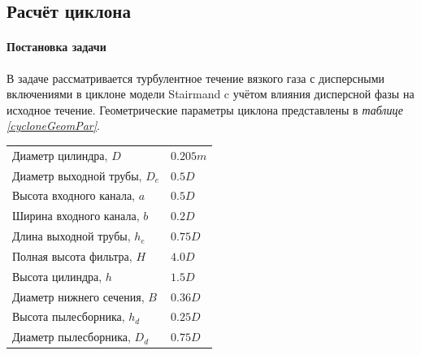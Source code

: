 \subsection{Расчёт циклона}
\label{cycRes}
\paragraph{Постановка задачи\\}
В задаче рассматривается турбулентное течение вязкого газа с дисперсными включениями в циклоне модели Stairmand c учётом влияния дисперсной фазы на исходное течение. Геометрические параметры циклона представлены в \textit{таблице \ref{cycloneGeomPar}}.

  \begin{minipage}{0.6\textwidth}
    \label{cycloneGeomPar}
			\begin{tabular}{l l}
				\hline
				\label{geometrytable}
				Диаметр цилиндра, $D$ & $0.205m$ \\
				Диаметр выходной трубы, $D_e$ & $0.5D$ \\
				Высота входного канала, $a$ & $0.5D$ \\
				Ширина входного канала, $b$ & $0.2D$ \\
				Длина выходной трубы, $h_e$ & $0.75D$ \\
				Полная высота фильтра, $H$ & $4.0D$ \\
				Высота цилиндра, $h$ & $1.5D$ \\
				Диаметр нижнего сечения, $B$ & $0.36D$ \\
				Высота пылесборника, $h_d$ & $0.25D$ \\
				Диаметр пылесборника, $D_d$ & $0.75D$ \\
			\end{tabular}
    \end{minipage}
    \hspace{1em}
